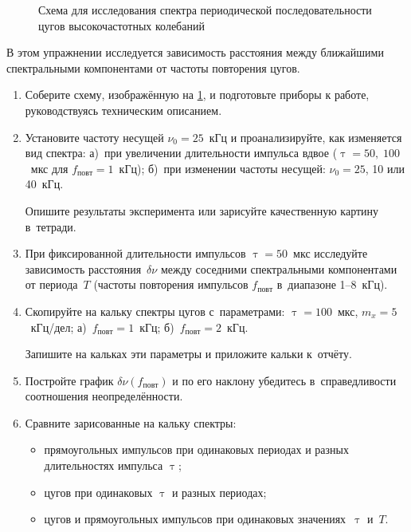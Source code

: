 \begin{figure}
	\label{fig:3}
	\caption{Схема для исследования спектра периодической последовательности цугов высокочастотных колебаний}
\end{figure}

\begin{lab:task}

В этом упражнении исследуется зависимость расстояния между ближайшими спектральными компонентами от частоты повторения цугов.

\begin{enumerate}
	\item Соберите схему, изображённую на \ref{fig:3}, и подготовьте приборы к работе, руководствуясь техническим описанием.
	\item Установите частоту несущей $\nu_0=25$~кГц и проанализируйте, как изменяется вид спектра: а)~при увеличении длительности импульса вдвое ($\uptau=50,\;100$~мкс для $f_{повт}=1$~кГц); б)~при изменении частоты несущей: $\nu_0=25$, 10 или 40~кГц.
	
	Опишите результаты эксперимента или зарисуйте качественную картину в~тетради.
	\item При фиксированной длительности импульсов $\uptau=50$~мкс исследуйте зависимость расстояния~$\delta \nu$ между соседними спектральными компонентами от периода~$T$ (частоты повторения импульсов $f_{повт}$ в~диапазоне 1--8~кГц).
	\item Скопируйте на кальку спектры цугов с~параметрами: $\uptau=100$~мкс, $m_x=5$~кГц/дел; а)~$f_{повт}=1$~кГц; б)~$f_{повт}=2$~кГц.
	
	Запишите на кальках эти параметры и приложите кальки к~отчёту.
	
	\item Постройте график $\delta \nu(f_{повт})$ и по его наклону убедитесь в~справедливости соотношения неопределённости.
	\item Сравните зарисованные на кальку спектры:
	\begin{itemize}
		\item прямоугольных импульсов при одинаковых периодах и разных длительностях импульса $\uptau$;
		\item цугов при одинаковых $\uptau$ и разных периодах;
		\item цугов и прямоугольных импульсов при одинаковых значениях~$\uptau$ и~$T$.
	\end{itemize}
	
\end{enumerate}

\end{lab:task}

